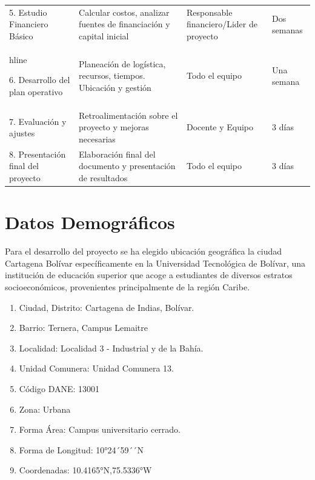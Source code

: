 \documentclass[letterpaper, 11pt]{report}
\begin{document}
\begin{longtable}{|p{.2\linewidth}|p{.2\linewidth}|p{.3\linewidth}|p{.2\linewidth}|}
      5. Estudio Financiero Básico                 & Calcular costos, analizar fuentes de financiación y capital inicial         & Responsable financiero/Lider de proyecto & Dos semanas                                  \\hline

      6. Desarrollo del plan operativo             & Planeación de logística, recursos, tiempos. Ubicación y gestión             & Todo el equipo                           & Una semana                                   \\\hline

      7. Evaluación y ajustes                      & Retroalimentación sobre el proyecto y mejoras necesarias                    & Docente y Equipo                         & 3 días                                       \\\hline

      8. Presentación final del proyecto           & Elaboración final del documento y presentación de resultados                & Todo el equipo                           & 3 días                                       \\\hline

\end{longtable}

\section{Datos Demográficos}

Para el desarrollo del proyecto se ha elegido ubicación geográfica la ciudad
Cartagena Bolívar específicamente en la Universidad Tecnológica de Bolívar, una
institución de educación superior que acoge a estudiantes de diversos estratos
socioeconómicos, provenientes principalmente de la región Caribe.

\begin{enumerate}
      \item Ciudad, Distrito: Cartagena de Indias, Bolívar.
      \item Barrio: Ternera, Campus Lemaitre
      \item Localidad: Localidad 3 - Industrial y de la Bahía.
      \item Unidad Comunera: Unidad Comunera 13.
      \item Código DANE:\@{} 13001
      \item Zona: Urbana
      \item Forma Área: Campus universitario cerrado.
      \item Forma de Longitud: 10°24´59´´N
      \item Coordenadas: 10.4165°N,75.5336°W
\end{enumerate}
\end{document}
